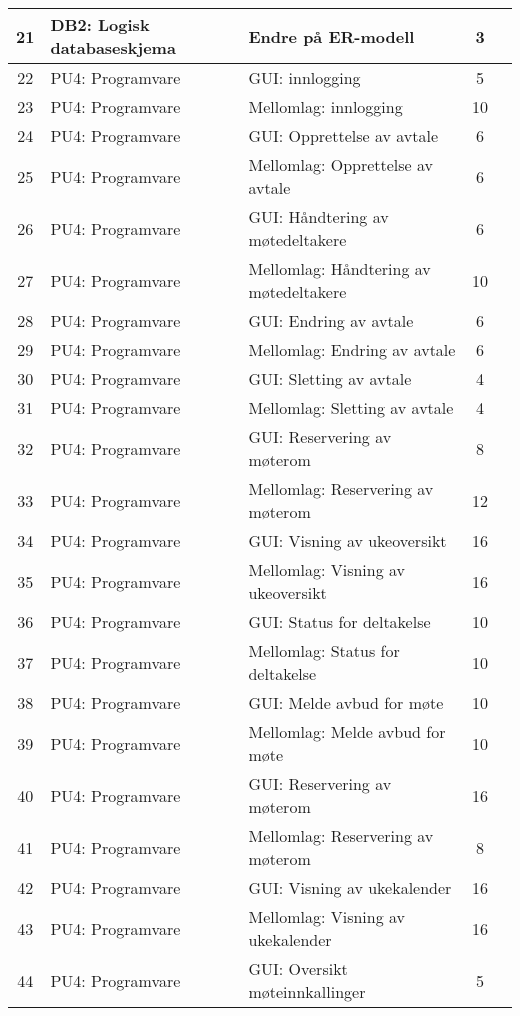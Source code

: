 \begin{longtable}[l]{|c|l|l|c|c|}
	21 & DB2: Logisk databaseskjema & Endre på ER-modell & 3 & \\ \hline
	22 & PU4: Programvare & GUI: innlogging & 5 & \\ \hline
	23 & PU4: Programvare & Mellomlag: innlogging & 10 & \\ \hline
	24 & PU4: Programvare & GUI: Opprettelse av avtale & 6 & \\ \hline
	25 & PU4: Programvare & Mellomlag: Opprettelse av avtale & 6 & \\ \hline
	26 & PU4: Programvare & GUI: Håndtering av møtedeltakere & 6 & \\ \hline
	27 & PU4: Programvare & Mellomlag: Håndtering av møtedeltakere & 10 & \\ \hline
	28 & PU4: Programvare & GUI: Endring av avtale & 6 & \\  \hline
	29 & PU4: Programvare & Mellomlag: Endring av avtale & 6 & \\ \hline
	30 & PU4: Programvare & GUI: Sletting av avtale & 4 & \\ \hline
	31 & PU4: Programvare & Mellomlag: Sletting av avtale & 4 & \\ \hline
	32 & PU4: Programvare & GUI: Reservering av møterom & 8 & \\ \hline
	33 & PU4: Programvare & Mellomlag: Reservering av møterom & 12 & \\ \hline
	34 & PU4: Programvare & GUI: Visning av ukeoversikt & 16 & \\ \hline
	35 & PU4: Programvare & Mellomlag:  Visning av ukeoversikt  & 16 & \\ \hline
	36 & PU4: Programvare & GUI: Status for deltakelse & 10 & \\ \hline
	37 & PU4: Programvare & Mellomlag: Status for deltakelse  & 10 & \\ \hline
	38 & PU4: Programvare & GUI: Melde avbud for møte & 10 & \\ \hline
	39 & PU4: Programvare & Mellomlag: Melde avbud for møte  & 10 & \\ \hline
	40 & PU4: Programvare & GUI: Reservering av møterom & 16 & \\ \hline
	41 & PU4: Programvare & Mellomlag: Reservering av møterom & 8 & \\ \hline
	42 & PU4: Programvare & GUI: Visning av ukekalender & 16 & \\ \hline
	43 & PU4: Programvare & Mellomlag: Visning av ukekalender  & 16 & \\ \hline
	44 & PU4: Programvare & GUI: Oversikt møteinnkallinger & 5 & \\ \hline

\end{longtable}
